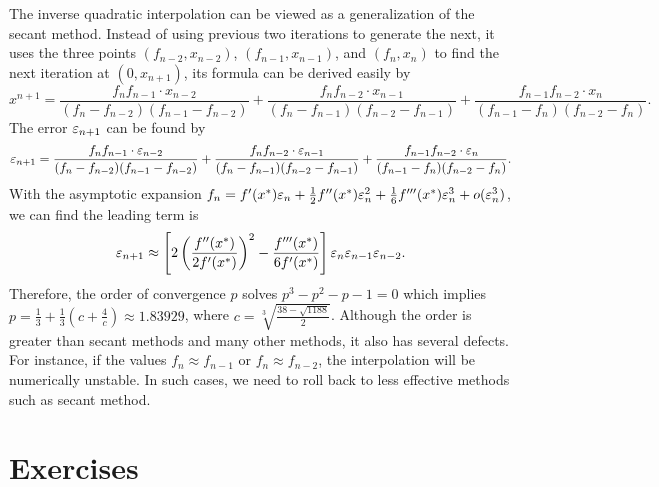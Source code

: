 The inverse quadratic interpolation can be viewed as a generalization of the secant method. Instead of using previous two iterations to generate the next, it uses the three points $(f_{n-2}, x_{n-2})$, $(f_{n-1}, x_{n-1})$, and $(f_{n}, x_{n})$ to find the next iteration at $(0, x_{n+1})$, its formula can be derived easily by 
\begin{equation*}
    x^{n+1} = \frac{f_n f_{n-1}\cdot x_{n-2}}{(f_n - f_{n-2})(f_{n-1} - f_{n-2})}  +  \frac{f_n f_{n-2}\cdot x_{n-1} }{(f_{n} - f_{n-1})(f_{n-2} - f_{n-1})} +  \frac{f_{n-1} f_{n-2}\cdot  x_{n}}{(f_{n-1} - f_{n})(f_{n-2} - f_{n})}.
\end{equation*}
The error $\varepsilon_{n+1}$ can be found by 
\begin{equation*}
    \varepsilon_{n+1} = \frac{f_n f_{n-1} \cdot \varepsilon_{n-2} }{(f_n - f_{n-2})(f_{n-1} - f_{n-2})}  +  \frac{f_n f_{n-2}\cdot \varepsilon_{n-1}  }{(f_{n} - f_{n-1})(f_{n-2} - f_{n-1})} +  \frac{f_{n-1} f_{n-2}\cdot  \varepsilon_{n}}{(f_{n-1} - f_{n})(f_{n-2} - f_{n})}.
\end{equation*}
With the asymptotic expansion $f_n = f'(x^{\ast}) \varepsilon_n + \frac{1}{2} f''(x^{\ast}) \varepsilon_n^2 + \frac{1}{6} f'''(x^{\ast})\varepsilon_n^3 + o(\varepsilon_n^3)$, we can find the leading term is 
$$\varepsilon_{n+1} \approx \left[2 \left(\frac{f''(x^{\ast})}{2f'(x^{\ast})} \right)^2 - \frac{f'''(x^{\ast})}{6f'(x^{\ast})} \right]\varepsilon_{n}\varepsilon_{n-1}\varepsilon_{n-2}.$$
Therefore, the order of convergence $p$ solves $p^3 - p^2 - p - 1 = 0$ which implies $p = \frac{1}{3} + \frac{1}{3}\left(c + \frac{4}{c}\right)\approx 1.83929$, where $c = \sqrt[3]{\frac{38 - \sqrt{1188}}{2}}$. Although the order is greater than secant methods and many other methods, it also has several defects. For instance, if the values $f_n\approx f_{n-1}$ or $f_n\approx f_{n-2}$, the interpolation will be numerically unstable. In such cases, we need to roll back to less effective methods such as secant method.  

\section{Exercises}
